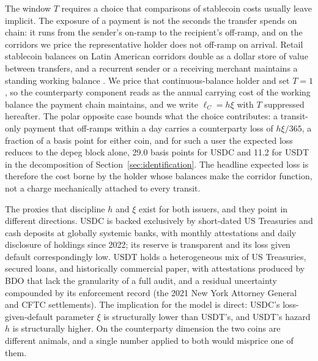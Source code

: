 The window $T$ requires a choice that comparisons of stablecoin costs usually leave implicit. The exposure of a payment is not the seconds the transfer spends on chain: it runs from the sender's on-ramp to the recipient's off-ramp, and on the corridors we price the representative holder does not off-ramp on arrival. Retail stablecoin balances on Latin American corridors double as a dollar store of value between transfers, and a recurrent sender or a receiving merchant maintains a standing working balance \citep{chainalysis_2025, aldasoro_frost_ito_2026}. We price that continuous-balance holder and set $T = 1$, so the counterparty component reads as the annual carrying cost of the working balance the payment chain maintains, and we write $\ell_C = h \xi$ with $T$ suppressed hereafter. The polar opposite case bounds what the choice contributes: a transit-only payment that off-ramps within a day carries a counterparty loss of $h\xi/365$, a fraction of a basis point for either coin, and for such a user the expected loss reduces to the depeg block alone, 29.0 basis points for USDC and 11.2 for USDT in the decomposition of Section~\ref{sec:identification}. The headline expected loss is therefore the cost borne by the holder whose balances make the corridor function, not a charge mechanically attached to every transit.

The proxies that discipline $h$ and $\xi$ exist for both issuers, and they point in different directions. USDC is backed exclusively by short-dated US Treasuries and cash deposits at globally systemic banks, with monthly attestations and daily disclosure of holdings since 2022; its reserve is transparent and its loss given default correspondingly low. USDT holds a heterogeneous mix of US Treasuries, secured loans, and historically commercial paper, with attestations produced by BDO that lack the granularity of a full audit, and a residual uncertainty compounded by its enforcement record (the 2021 New York Attorney General and CFTC settlements). The implication for the model is direct: USDC's loss-given-default parameter $\xi$ is structurally lower than USDT's, and USDT's hazard $h$ is structurally higher. On the counterparty dimension the two coins are different animals, and a single number applied to both would misprice one of them.

